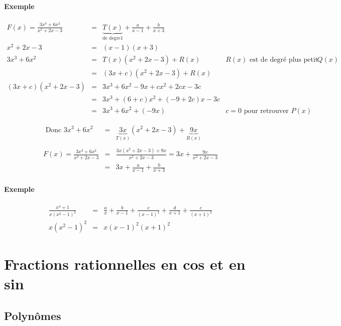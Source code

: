 \paragraph{Exemple}

\[\begin{array}{rclr}
F(x) = \frac{3x^3 + 6x^2}{x^2+2x-3} &=& \underbrace{T(x)}_{\text{de degre} 1} + \frac{a}{x-1} + \frac{b}{x+3}\\
x^2 + 2x - 3 &=& (x-1)(x+3) \\
3x^3 + 6x^2 &=& T(x) (x^2 + 2x - 3) + R(x) & R(x) \text{ est de degré plus petit que celui de } Q(x) \\
&=& (3x + c)(x^2 + 2x -3) + R(x) \\
(3x + c)(x^2 +2x - 3) &=& 3x^3 + 6x^2 - 9x +cx^2 + 2cx -3c \\
&=& 3x^3 +(6+c)x^2 +(-9+2c)x - 3c \\
&=& 3x^3 + 6x^2 + (-9x) & c=0 \text{ pour retrouver } P(x)
\end{array}\]

\[\begin{array}{rcl}
\text{ Donc }  3x^3 + 6x^2 &=& \underbrace{3x}_{T(x)}(x^2 + 2x - 3) + \underbrace{9x}_{R(x)} \\
\\
F(x) = \frac{3x^3 + 6x^2}{x^2 + 2x -3} &=& \frac{3x(x^2 +2x - 3) + 9x}{x^2 + 2x - 3} = 3x + \frac{9x}{x^2 + 2x - 3} \\
&=& 3x + \frac{a}{x-1} + \frac{b}{x+3} \end{array}\]

\paragraph{Exemple} 

\[\begin{array}{rcl}
	\frac{x^4 + 1}{x(x^2 - 1)^2} &=& \frac{a}{x} + \frac{b}{x-1} + \frac{c}{(x-1)^2} + \frac{d}{x+1} + \frac{e}{(x+1)^2} \\
	x(x^2 -1)^2 &=& x(x-1)^2(x+1)^2 \end{array}\]

\section{Fractions rationnelles en cos et en sin}

\subsection{Polynômes}

